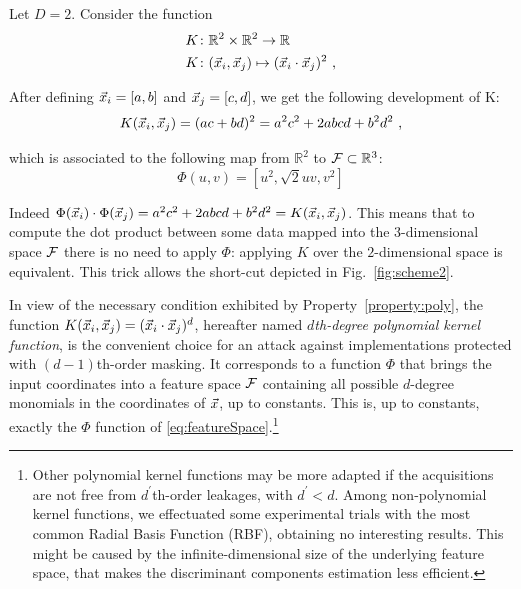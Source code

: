 \begin{example}\label{ex:polyKernel}
Let $D=2$. Consider the function
\begin{align}
&K\colon\mathbb{R}^2\times \mathbb{R}^2 \rightarrow \mathbb{R} \nonumber \\ 
&K\colon(\vec{x}_i,\vec{x}_j) \mapsto ( \vec{x}_i\cdot \vec{x}_j)^2 \mbox{ ,} \label{eq:example1}
\end{align}

After defining $\vec{x}_i = [a,b]$ and $\vec{x}_j = [c,d]$, we get the following development of K:
\begin{equation}
K(\vec{x}_i,\vec{x}_j) = (ac + bd)^2 = a^2c^2 + 2abcd + b^2d^2 \mbox{ ,}
\end{equation}

which is associated to the following map from $\mathbb{R}^2$ to $\mathcal{F} \subset\mathbb{R}^3$:
\begin{equation}
\Phi(u,v) =  [u^2, \sqrt{2}uv, v^2]
\end{equation}

Indeed $\Phi(\vec{x}_i)\cdot \Phi(\vec{x}_j) = a^2c^2 + 2abcd + b^2d^2 = K(\vec{x}_i,\vec{x}_j)$\enspace. This means that to compute the dot product between some data mapped into the $3$-dimensional space $\mathcal{F}$ there is no need to apply $\Phi$: applying $K$ over the $2$-dimensional space is equivalent. This trick allows the short-cut depicted in Fig.~\ref{fig:scheme2}.

\end{example}



In view of the necessary condition exhibited by Property~\ref{property:poly},  the function $K(\vec{x}_i,\vec{x}_j) = (\vec{x}_i \cdot \vec{x}_j)^d$, hereafter named \emph{$d$th-degree polynomial kernel function}, is the convenient choice for an attack against implementations protected with $(d-1)$th-order masking. It corresponds to a function $\Phi$ that brings the input coordinates into a feature space $\mathcal{F}$ containing all possible $d$-degree monomials in the coordinates of $\vec{x}$, up to constants. This is, up to constants, exactly the $\Phi$ function of \eqref{eq:featureSpace}.\footnote{Other polynomial kernel functions may be more adapted if the acquisitions are not free from $d^\prime$th-order leakages, with $d^\prime<d$. Among non-polynomial kernel functions, we effectuated some experimental trials with the most common Radial Basis Function (RBF), obtaining no interesting results. This might be caused by the infinite-dimensional size of the underlying feature space, that makes the discriminant components estimation less efficient.}\\ 

